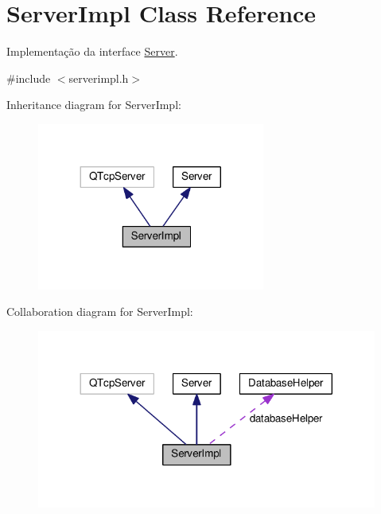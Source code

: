 \hypertarget{classServerImpl}{}\section{Server\+Impl Class Reference}
\label{classServerImpl}


Implementação da interface \hyperlink{classServer}{Server}.  




{\ttfamily \#include $<$serverimpl.\+h$>$}



Inheritance diagram for Server\+Impl\+:
\nopagebreak
\begin{figure}[H]
\begin{center}
\leavevmode
\includegraphics[width=212pt]{d3/da0/classServerImpl__inherit__graph}
\end{center}
\end{figure}


Collaboration diagram for Server\+Impl\+:
\nopagebreak
\begin{figure}[H]
\begin{center}
\leavevmode
\includegraphics[width=317pt]{de/d15/classServerImpl__coll__graph}
\end{center}
\end{figure}
